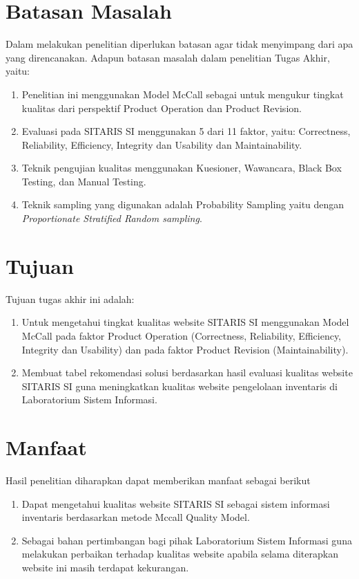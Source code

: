 \section{Batasan Masalah}
Dalam melakukan penelitian diperlukan batasan agar tidak menyimpang dari apa yang direncanakan. Adapun batasan masalah dalam penelitian Tugas Akhir, yaitu:
\begin{enumerate}
	\item Penelitian ini menggunakan Model McCall sebagai untuk mengukur tingkat kualitas dari perspektif Product Operation dan Product Revision.
	\item Evaluasi pada SITARIS SI menggunakan 5 dari 11 faktor, yaitu: Correctness, Reliability, Efficiency, Integrity dan Usability dan Maintainability.
	\item Teknik pengujian kualitas menggunakan Kuesioner, Wawancara, Black Box Testing, dan Manual Testing.
	\item Teknik sampling yang digunakan adalah Probability Sampling yaitu dengan \textit{Proportionate Stratified Random sampling}.
\end{enumerate}

\section{Tujuan}
Tujuan tugas akhir ini adalah:
\begin{enumerate}
	\item Untuk mengetahui tingkat kualitas website SITARIS SI menggunakan Model McCall pada faktor Product Operation (Correctness, Reliability, Efficiency, Integrity dan Usability) dan pada faktor Product Revision (Maintainability).
	\item Membuat tabel rekomendasi solusi berdasarkan hasil evaluasi kualitas website SITARIS SI guna meningkatkan kualitas website pengelolaan inventaris di Laboratorium Sistem Informasi.	
\end{enumerate}

\section{Manfaat}
Hasil penelitian diharapkan dapat memberikan manfaat sebagai berikut
\begin{enumerate}
	\item Dapat mengetahui kualitas website SITARIS SI sebagai sistem informasi inventaris berdasarkan metode Mccall Quality Model.
	\item Sebagai bahan pertimbangan bagi pihak Laboratorium Sistem Informasi guna melakukan perbaikan terhadap kualitas website apabila selama diterapkan website ini masih terdapat kekurangan.
\end{enumerate}

